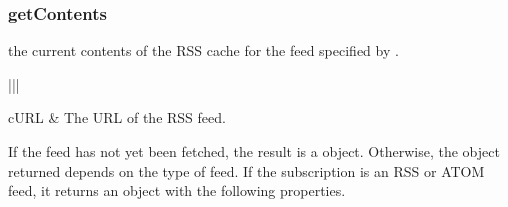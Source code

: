 \documentclass[letterpaper,12pt,english,openany,oneside]{sphinxmanual}
\begin{document}
\subsubsection{getContents}
\label{\detokenize{Tracker_InboxAPI:getcontents}}
 the current contents of the RSS cache for the feed specified by .

\label{\detokenize{Tracker_InboxAPI:parameters-2}}


\begin{savenotes}\sphinxattablestart
\centering
{}\label{\detokenize{Tracker_InboxAPI:section-8}}\nobreak
\begin{tabular}[t]{|||}
\hline

cURL
&
The URL of the RSS feed.
\\
\hline
\end{tabular}
\par
\sphinxattableend\end{savenotes}


\begin{sphinxVerbatim}[commandchars=\\\{\}]
\end{sphinxVerbatim}

If the feed has not yet been fetched, the result is a  object. Otherwise, the object returned depends on the type of feed. If the subscription is an RSS or ATOM feed, it returns an object with the following properties.
\end{document}
